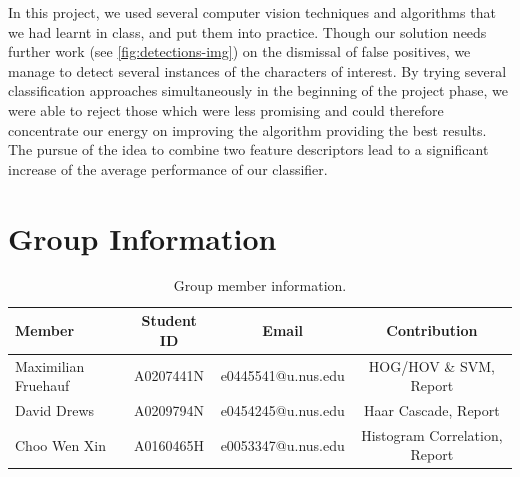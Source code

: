 \documentclass[11pt]{article}
\begin{document}
In this project, we used several computer vision techniques and algorithms that we had
learnt in class, and put them into practice. Though our solution needs further work (see \autoref{fig:detections-img}) on the dismissal of
false positives, we manage to detect several instances of the characters of interest. By trying several
classification approaches simultaneously in the beginning of the project phase, we were able to reject those
which were less promising and could therefore concentrate our energy on improving the algorithm providing
the best results. The pursue of the idea to combine two feature descriptors lead to a significant increase
of the average performance of our classifier.

\pagebreak

\section{Group Information}

\begin{table}[ht]
    \centering
    \begin{tabular}{lccc}
    \toprule
     Member & Student ID & Email & Contribution\\
    \midrule
    Maximilian Fruehauf& A0207441N & e0445541@u.nus.edu & HOG/HOV \& SVM, Report \\
    David Drews & A0209794N & e0454245@u.nus.edu & Haar Cascade, Report \\
    Choo Wen Xin& A0160465H & e0053347@u.nus.edu & Histogram Correlation, Report \\
    \bottomrule
    \end{tabular}
    \caption{Group member information.}
    \label{tab:dataset}
\end{table}





 
\end{document}
